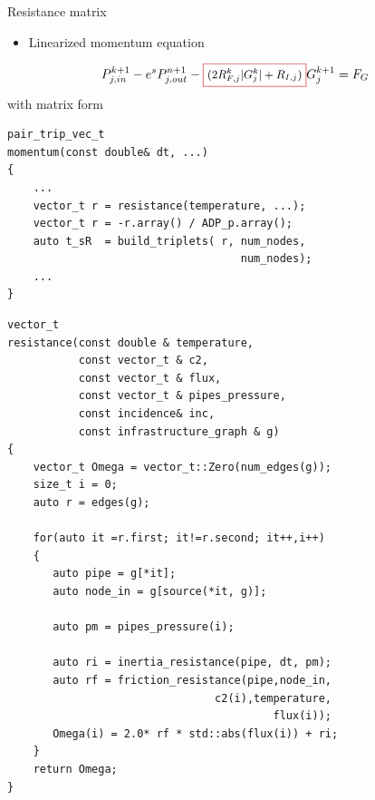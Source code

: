 \begin{frame}[fragile]{Resistance matrix}
\noindent
\begin{minipage}{0.45\textwidth}
\begin{itemize}
    \setlength{\itemindent}{-2.em}
    \item Linearized momentum equation
\end{itemize}
    \noindent \hspace{-0.5cm}
    \[\small
        P_{j,in}^{k+1} - e^sP_{j,out}^{n+1} -\fbox{$(2R^k_{F,j}|G_j^{k}| + R_{I,j})$} G_j^{k+1} = F_G
    \]
    with matrix form 
    \begin{center}
       
    \end{center}


\begin{center}   
\begin{verbatim}
pair_trip_vec_t
momentum(const double& dt, ...)
{  
    ...
    vector_t r = resistance(temperature, ...);
    vector_t r = -r.array() / ADP_p.array();
    auto t_sR  = build_triplets( r, num_nodes,
                                    num_nodes);
    ...    
}
\end{verbatim}
\end{center}
\end{minipage}
\hfill
\begin{minipage}{0.47\textwidth}
\begin{verbatim}
vector_t
resistance(const double & temperature,
           const vector_t & c2,
           const vector_t & flux,
           const vector_t & pipes_pressure,
           const incidence& inc,
           const infrastructure_graph & g)
{
    vector_t Omega = vector_t::Zero(num_edges(g));
    size_t i = 0;
    auto r = edges(g);
    
    for(auto it =r.first; it!=r.second; it++,i++)
    {
       auto pipe = g[*it]; 
       auto node_in = g[source(*it, g)];                        

       auto pm = pipes_pressure(i);

       auto ri = inertia_resistance(pipe, dt, pm);    
       auto rf = friction_resistance(pipe,node_in,
                                c2(i),temperature,
                                         flux(i));
       Omega(i) = 2.0* rf * std::abs(flux(i)) + ri; 
    }
    return Omega;
} 
\end{verbatim}
\end{minipage}
\end{frame}

